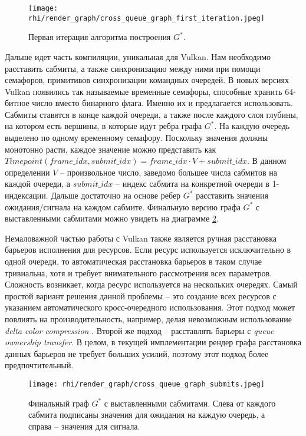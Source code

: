 \begin{figure}
    \centering
    \texttt{[image: rhi/render\_graph/cross\_queue\_graph\_first\_iteration.jpeg]}
    \caption{Первая итерация алгоритма построения $G^*$.}
    \label{fig:cross_queue_graph_first_iteration}
\end{figure}

Дальше идет часть компиляции, уникальная для Vulkan. Нам необходимо расставить сабмиты, а также синхронизацию между ними при помощи семафоров, примитивов синхронизации командных очередей. В новых версиях Vulkan появились так называемые временные семафоры, способные хранить 64-битное число вместо бинарного флага. Именно их и предлагается использовать. Сабмиты ставятся в конце каждой очереди, а также после каждого слоя глубины, на котором есть вершины, в которые идут ребра графа $G^*$. На каждую очередь выделено по одному временному семафору. Поскольку значения должны монотонно расти, каждое значение можно представить как $Timepoint(frame\_idx, submit\_idx) = frame\_idx \cdot V + submit\_idx$. В данном определении $V$ -- произвольное число, заведомо большее числа сабмитов на каждой очереди, а $submit\_idx$ -- индекс сабмита на конкретной очереди в 1-индексации. Дальше достаточно на основе ребер $G^*$ расставить значения ожидания/сигнала на каждом сабмите. Финальную версию графа $G^*$ с выставленными сабмитами можно увидеть на диаграмме \ref{fig:cross_queue_graph_submits}.

Немаловажной частью работы с Vulkan также является ручная расстановка барьеров исполнения для ресурсов. Если ресурс используется исключительно в одной очереди, то автоматическая расстановка барьеров в таком случае тривиальна, хотя и требует внимательного рассмотрения всех параметров. Сложность возникает, когда ресурс используется на нескольких очередях. Самый простой вариант решения данной проблемы -- это создание всех ресурсов с указанием автоматического кросс-очередного использования. Этот подход может повлиять на производительность, например, делая невозможным использование \textit{delta color compression} \cite{optimising_a_aaa_vulkan_title_on_desktop}. Второй же подход -- расставлять барьеры с \textit{queue ownership transfer}. В целом, в текущей имплементации рендер графа расстановка данных барьеров не требует больших усилий, поэтому этот подход более предпочтительный.

\begin{figure}
    \texttt{[image: rhi/render\_graph/cross\_queue\_graph\_submits.jpeg]}
    \caption{Финальный граф $G^*$ с выставленными сабмитами. Слева от каждого сабмита подписаны значения для ожидания на каждую очередь, а справа -- значения для сигнала.}
    \label{fig:cross_queue_graph_submits}
\end{figure}


